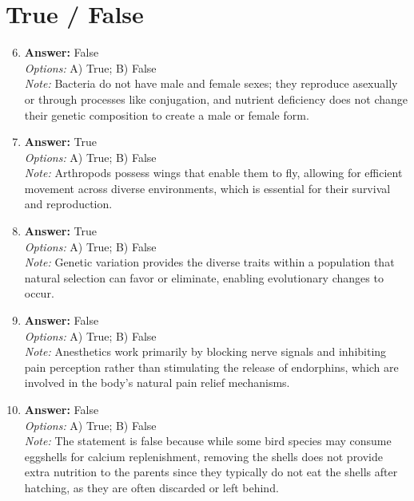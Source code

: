 \documentclass[12pt]{article}
\begin{document}
\section*{True / False}
\begin{enumerate}[label=\arabic*.]
\setcounter{enumi}{5}
\item \textbf{Answer:} False
\\ \textit{Options:} A) True; B) False
\\ \textit{Note:} Bacteria do not have male and female sexes; they reproduce asexually or through processes like conjugation, and nutrient deficiency does not change their genetic composition to create a male or female form.
\item \textbf{Answer:} True
\\ \textit{Options:} A) True; B) False
\\ \textit{Note:} Arthropods possess wings that enable them to fly, allowing for efficient movement across diverse environments, which is essential for their survival and reproduction.
\item \textbf{Answer:} True
\\ \textit{Options:} A) True; B) False
\\ \textit{Note:} Genetic variation provides the diverse traits within a population that natural selection can favor or eliminate, enabling evolutionary changes to occur.
\item \textbf{Answer:} False
\\ \textit{Options:} A) True; B) False
\\ \textit{Note:} Anesthetics work primarily by blocking nerve signals and inhibiting pain perception rather than stimulating the release of endorphins, which are involved in the body's natural pain relief mechanisms.
\item \textbf{Answer:} False
\\ \textit{Options:} A) True; B) False
\\ \textit{Note:} The statement is false because while some bird species may consume eggshells for calcium replenishment, removing the shells does not provide extra nutrition to the parents since they typically do not eat the shells after hatching, as they are often discarded or left behind.
\end{enumerate}
\end{document}
